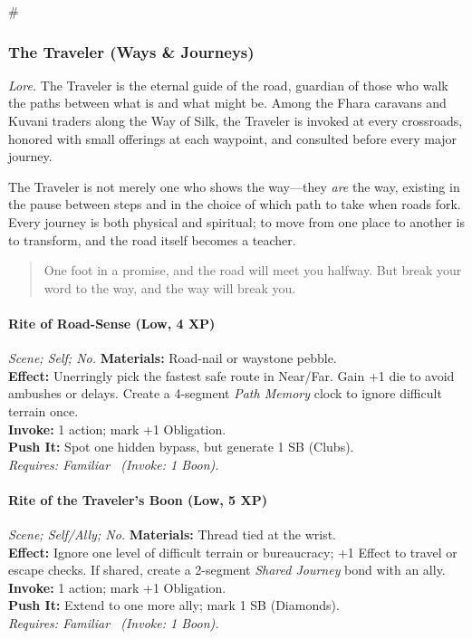 # %

\subsubsection{The Traveler (Ways \& Journeys)}
\textit{Lore.} The Traveler is the eternal guide of the road, guardian of those who walk the paths between what is and what might be. Among the Fhara caravans and Kuvani traders along the Way of Silk, the Traveler is invoked at every crossroads, honored with small offerings at each waypoint, and consulted before every major journey.

The Traveler is not merely one who shows the way—they \emph{are} the way, existing in the pause between steps and in the choice of which path to take when roads fork. Every journey is both physical and spiritual; to move from one place to another is to transform, and the road itself becomes a teacher.

\begin{quote}
One foot in a promise, and the road will meet you halfway. But break your word to the way, and the way will break you.
\end{quote}

\paragraph*{Rite of Road-Sense (Low, 4 XP)} \emph{Scene; Self; No.}
\textbf{Materials:} Road-nail or waystone pebble.\\
\textbf{Effect:} Unerringly pick the fastest safe route in Near/Far. Gain +1 die to avoid ambushes or delays. Create a 4-segment \emph{Path Memory} clock to ignore difficult terrain once.\\
\textbf{Invoke:} 1 action; mark +1 Obligation.\\
\textbf{Push It:} Spot one hidden bypass, but generate 1 SB (Clubs).\\
\emph{Requires: Familiar \ (\textit{Invoke:} 1 Boon).}

\paragraph*{Rite of the Traveler's Boon (Low, 5 XP)} \emph{Scene; Self/Ally; No.}
\textbf{Materials:} Thread tied at the wrist.\\
\textbf{Effect:} Ignore one level of difficult terrain or bureaucracy; +1 Effect to travel or escape checks. If shared, create a 2-segment \emph{Shared Journey} bond with an ally.\\
\textbf{Invoke:} 1 action; mark +1 Obligation.\\
\textbf{Push It:} Extend to one more ally; mark 1 SB (Diamonds).\\
\emph{Requires: Familiar \ (\textit{Invoke:} 1 Boon).}

